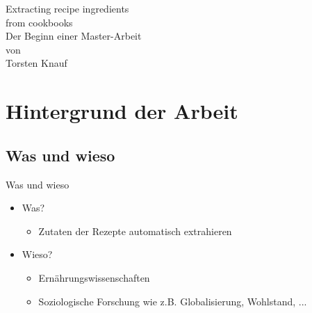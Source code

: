 \documentclass[12pt]{beamer}
\begin{document}
\begin{frame}
\begin{minipage}{0.25\textwidth}
	\end{minipage}
	\begin{minipage}{0.7\textwidth}
		\begin{center}
			\vspace{-1.5cm}
			\Large{Extracting recipe ingredients \\ from cookbooks} \\
			\vspace{0.5cm}
			\large{Der Beginn einer Master-Arbeit} \\
			\small{von \\ \vspace{-0.1cm} Torsten Knauf}
		\end{center}
	\end{minipage}
\end{frame}

\begin{frame}
	\tableofcontents
\end{frame}

\section{Hintergrund der Arbeit}
\subsection{Was und wieso}
\begin{frame}{Was und wieso}
	\begin{itemize}
		\item Was?
		\begin{itemize}
			\item Zutaten der Rezepte automatisch extrahieren
		\end{itemize}
		\item Wieso?
		\begin{itemize}
			\item Ernährungswissenschaften
			\item Soziologische Forschung wie z.B. Globalisierung, Wohlstand, ...
		\end{itemize}
	\end{itemize}
\end{frame}
\end{document}

